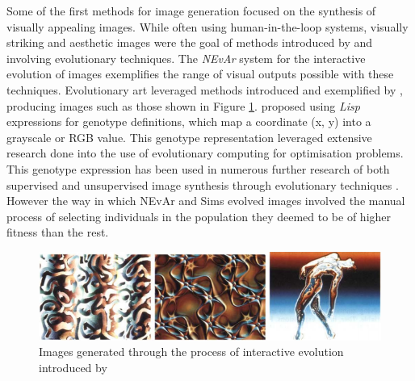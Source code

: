 \documentclass{article}
\begin{document}
Some of the first methods for image generation focused on the synthesis of visually appealing images.
While often using human-in-the-loop systems, visually striking and aesthetic images were the goal of methods introduced by \citet{sims} and \citet{nevar} involving evolutionary techniques.
The \textit{NEvAr} \citep{nevar} system for the interactive evolution of images exemplifies the range of visual outputs possible with these techniques.
Evolutionary art leveraged methods introduced and exemplified by \citet{sims}, producing images such as those shown in Figure \ref{fig:sims}.
\citet{sims} proposed using \textit{Lisp} expressions for genotype definitions, which map a coordinate (x, y) into a grayscale or RGB value.
This genotype representation leveraged extensive research done into the use of evolutionary computing for optimisation problems.
This genotype expression has been used in numerous further research of both supervised and unsupervised image synthesis through evolutionary techniques \citep{nevar, sims, den2011evolving, distributed-evolutionary-art, aesthetic-measures}.
However the way in which NEvAr and Sims evolved images involved the manual process of selecting individuals in the population they deemed to be of higher fitness than the rest.

\begin{figure}[h!]
	\includegraphics[width=\textwidth]{images/sims-interactive-image-generation.png}
	\caption{Images generated through the process of interactive evolution introduced by \citet{sims}}
	\label{fig:sims}
\end{figure}
\end{document}
